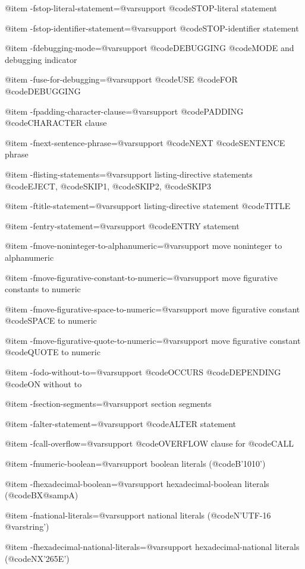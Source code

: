 @item -fstop-literal-statement=@var{support}
@code{STOP}-literal statement

@item -fstop-identifier-statement=@var{support}
@code{STOP}-identifier statement

@item -fdebugging-mode=@var{support}
@code{DEBUGGING} @code{MODE} and debugging indicator

@item -fuse-for-debugging=@var{support}
@code{USE} @code{FOR} @code{DEBUGGING}

@item -fpadding-character-clause=@var{support}
@code{PADDING} @code{CHARACTER} clause

@item -fnext-sentence-phrase=@var{support}
@code{NEXT} @code{SENTENCE} phrase

@item -flisting-statements=@var{support}
listing-directive statements @code{EJECT}, @code{SKIP1}, @code{SKIP2}, @code{SKIP3}

@item -ftitle-statement=@var{support}
listing-directive statement @code{TITLE}

@item -fentry-statement=@var{support}
@code{ENTRY} statement

@item -fmove-noninteger-to-alphanumeric=@var{support}
move noninteger to alphanumeric

@item -fmove-figurative-constant-to-numeric=@var{support}
move figurative constants to numeric

@item -fmove-figurative-space-to-numeric=@var{support}
move figurative constant @code{SPACE} to numeric

@item -fmove-figurative-quote-to-numeric=@var{support}
move figurative constant @code{QUOTE} to numeric

@item -fodo-without-to=@var{support}
@code{OCCURS} @code{DEPENDING} @code{ON} without to

@item -fsection-segments=@var{support}
section segments

@item -falter-statement=@var{support}
@code{ALTER} statement

@item -fcall-overflow=@var{support}
@code{OVERFLOW} clause for @code{CALL}

@item -fnumeric-boolean=@var{support}
boolean literals (@code{B'1010'})

@item -fhexadecimal-boolean=@var{support}
hexadecimal-boolean literals (@code{BX@samp{A}})

@item -fnational-literals=@var{support}
national literals (@code{N'UTF-16 @var{string}'})

@item -fhexadecimal-national-literals=@var{support}
hexadecimal-national literals (@code{NX'265E'})

